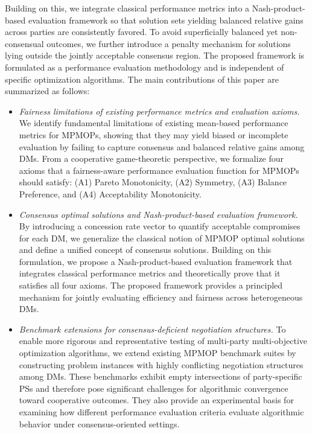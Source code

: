 \documentclass[journal]{IEEEtran}
\begin{document}
Building on this, we integrate classical performance metrics into a Nash-product-based evaluation framework so that solution sets yielding balanced relative gains across parties are consistently favored. To avoid superficially balanced yet non-consensual outcomes, we further introduce a penalty mechanism for solutions lying outside the jointly acceptable consensus region. The proposed framework is formulated as a performance evaluation methodology and is independent of specific optimization algorithms. The main contributions of this paper are summarized as follows:

\begin{itemize}
	\item \textit{Fairness limitations of existing performance metrics and evaluation axioms.}
	We identify fundamental limitations of existing mean-based performance metrics for MPMOPs, showing that they may yield biased or incomplete evaluation by failing to capture consensus and balanced relative gains among DMs. From a cooperative game-theoretic perspective, we formalize four axioms that a fairness-aware performance evaluation function for MPMOPs should satisfy: (A1) Pareto Monotonicity, (A2) Symmetry, (A3) Balance Preference, and (A4) Acceptability Monotonicity.
	
	\item \textit{Consensus optimal solutions and Nash-product-based evaluation framework.}
	By introducing a concession rate vector to quantify acceptable compromises for each DM, we generalize the classical notion of MPMOP optimal solutions and define a unified concept of consensus solutions. Building on this formulation, we propose a Nash-product-based evaluation framework that integrates classical performance metrics and theoretically prove that it satisfies all four axioms. The proposed framework provides a principled mechanism for jointly evaluating efficiency and fairness across heterogeneous DMs.
	
	\item 
	\textit{Benchmark extensions for consensus-deficient negotiation structures.}
	To enable more rigorous and representative testing of multi-party multi-objective optimization algorithms, we extend existing MPMOP benchmark suites by constructing problem instances with highly conflicting negotiation structures among DMs. These benchmarks exhibit empty intersections of party-specific PSs and therefore pose significant challenges for algorithmic convergence toward cooperative outcomes. They also provide an experimental basis for examining how different performance evaluation criteria evaluate algorithmic behavior under consensus-oriented settings.
	
\end{itemize}
\end{document}
